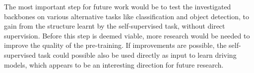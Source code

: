 The most important step for future work would be to test the investigated backbones on various alternative tasks like classification and object detection, to gain from the structure learnt by the self-supervised task, without direct supervision. Before this step is deemed viable, more research would be needed to improve the quality of the pre-training. If improvements are possible, the self-supervised task could possible also be used directly as input to learn driving models, which appears to be an interesting direction for future research. 


